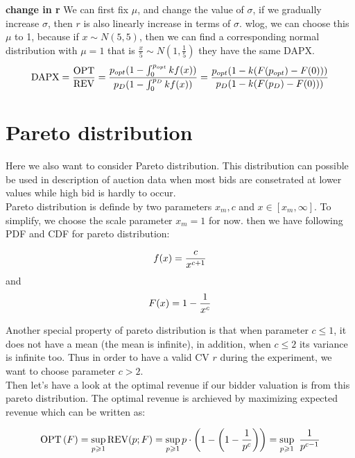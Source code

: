 \textbf{change in r}
We can first fix $\mu$, and change the value of $\sigma$, if we gradually increase $\sigma$, then $r$ is also linearly increase in terms of $\sigma$. wlog, we can choose this $\mu$ to 1, because if $x \sim N(5, 5)$, then we can find a corresponding normal distribution with $\mu = 1$ that is $\frac{x}{5} \sim N(1, \frac{1}{5})$ they have the same DAPX.
\begin{equation}\notag
\text{DAPX} = \frac{\text{OPT}}{\text{REV}} =\frac{p_{opt}(1-\int_{0}^{p_{opt}} kf(x))}{p_D(1-\int_{0}^{p_{D}}kf(x))} =\frac{p_{opt}(1-k(F(p_{opt})-F(0)))}{p_D(1-k(F(p_{D})-F(0)))} 	
\end{equation} 

\section{Pareto distribution}
Here we also want to consider Pareto distribution. This distribution can possible be used in description of auction data when most bids are consetrated at lower values while high bid is hardly to occur. \\
Pareto distribution is definde by two parameters $x_m, c$ and $x \in [x_m, \infty]$. To simplify, we choose the scale parameter $x_m = 1$ for now. then we have following PDF and CDF for pareto distribution:

\begin{equation}\notag
f(x) = \frac{c}{x^{c+1}} 
\end{equation} 
and 
\begin{equation}\notag
F(x) = 1- \frac{1}{x^c}
\end{equation} 

Another special property of pareto distribution is that when parameter $c \leqslant 1$, it does not have a mean (the mean is infinite), in addition, when $c \leqslant 2$ its variance is infinite too. Thus in order to have a valid CV $r$ during the experiment, we want to choose parameter $c > 2$. \\
Then let's have a look at the optimal revenue if our bidder valuation is from this pareto distribution. The optimal revenue is archieved by maximizing expected revenue which can be written as:

\begin{equation}\notag
\text{OPT}\left(F\right) = \sup_{p \geqslant 1} \text{REV}(p;F) = \sup_{p \geqslant 1} p \cdot \left(1-\left(1- \frac{1}{p^c}\right)\right) =\sup_{p \geqslant 1} \ \frac{1}{p^{c-1}}
\end{equation}

